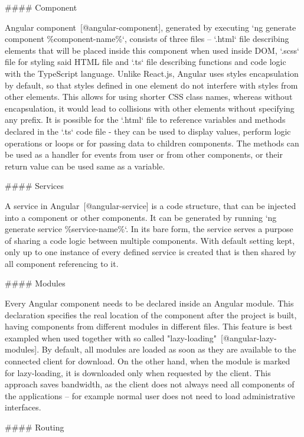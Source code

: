 \documentclass[
  digital, %
  oneside, %
  lof,     %
  lot,     %
]{fithesis4}
\begin{document}
{#### Component

Angular component~[@angular-component], generated by executing `ng generate component \%component-name\%`, consists of three files -- `.html` file describing elements that will be placed inside this component when used inside DOM, `.scss` file for styling said HTML file and `.ts` file describing functions and code logic with the TypeScript language. Unlike React.js, Angular uses styles encapsulation by default, so that styles defined in one element do not interfere with styles from other elements. This allows for using shorter CSS class names, whereas without encapsulation, it would lead to collisions with other elements without specifying any prefix. It is possible for the `.html` file to reference variables and methods declared in the `.ts` code file - they can be used to display values, perform logic operations or loops or for passing data to children components. The methods can be used as a handler for events from user or from other components, or their return value can be used same as a variable.

#### Services

A service in Angular~[@angular-service] is a code structure, that can be injected into a component or other components. It can be generated by running `ng generate service \%service-name\%`. In its bare form, the service serves a purpose of sharing a code logic between multiple components. With default setting kept, only up to one instance of every defined service is created that is then shared by all component referencing to it.

#### Modules

Every Angular component needs to be declared inside an Angular module. This declaration specifies the real location of the component after the project is built, having components from different modules in different files. This feature is best exampled when used together with so called "lazy-loading"~[@angular-lazy-modules]. By default, all modules are loaded as soon as they are available to the connected client for download. On the other hand, when the module is marked for lazy-loading, it is downloaded only when requested by the client. This approach saves bandwidth, as the client does not always need all components of the applications -- for example normal user does not need to load administrative interfaces.


#### Routing

}
\end{document}
